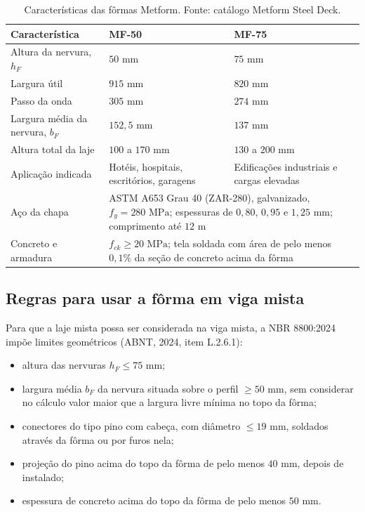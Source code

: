\documentclass[11pt,a4paper]{article}
\begin{document}
\begin{table}[!htbp]
  \centering
  \caption{Características das fôrmas Metform. Fonte: catálogo Metform Steel Deck.}
  \label{tab:metform}
  \small
  \begin{tabularx}{\linewidth}{lXX}
    \toprule
    \textbf{Característica} & \textbf{MF-50} & \textbf{MF-75} \\
    \midrule
    Altura da nervura, $h_F$ & $50\text{ mm}$ & $75\text{ mm}$ \\
    Largura útil & $915\text{ mm}$ & $820\text{ mm}$ \\
    Passo da onda & $305\text{ mm}$ & $274\text{ mm}$ \\
    Largura média da nervura, $b_F$ & $152{,}5\text{ mm}$ & $137\text{ mm}$ \\
    Altura total da laje & $100$ a $170\text{ mm}$ & $130$ a $200\text{ mm}$ \\
    Aplicação indicada & Hotéis, hospitais, escritórios, garagens & Edificações industriais e cargas elevadas \\
    Aço da chapa & \multicolumn{2}{p{9.5cm}}{ASTM A653 Grau 40 (ZAR-280), galvanizado, $f_y = 280\text{ MPa}$; espessuras de $0{,}80$, $0{,}95$ e $1{,}25\text{ mm}$; comprimento até $12\text{ m}$} \\
    Concreto e armadura & \multicolumn{2}{p{9.5cm}}{$f_{ck} \ge 20\text{ MPa}$; tela soldada com área de pelo menos $0{,}1\%$ da seção de concreto acima da fôrma} \\
    \bottomrule
  \end{tabularx}
\end{table}

\subsection{Regras para usar a fôrma em viga mista}

Para que a laje mista possa ser considerada na viga mista, a NBR 8800:2024 impõe limites geométricos (ABNT, 2024, item L.2.6.1):
\begin{itemize}
  \item altura das nervuras $h_F \le 75\text{ mm}$;
  \item largura média $b_F$ da nervura situada sobre o perfil $\ge 50\text{ mm}$, sem considerar no cálculo valor maior que a largura livre mínima no topo da fôrma;
  \item conectores do tipo pino com cabeça, com diâmetro $\le 19\text{ mm}$, soldados através da fôrma ou por furos nela;
  \item projeção do pino acima do topo da fôrma de pelo menos $40\text{ mm}$, depois de instalado;
  \item espessura de concreto acima do topo da fôrma de pelo menos $50\text{ mm}$.
\end{itemize}
\end{document}
